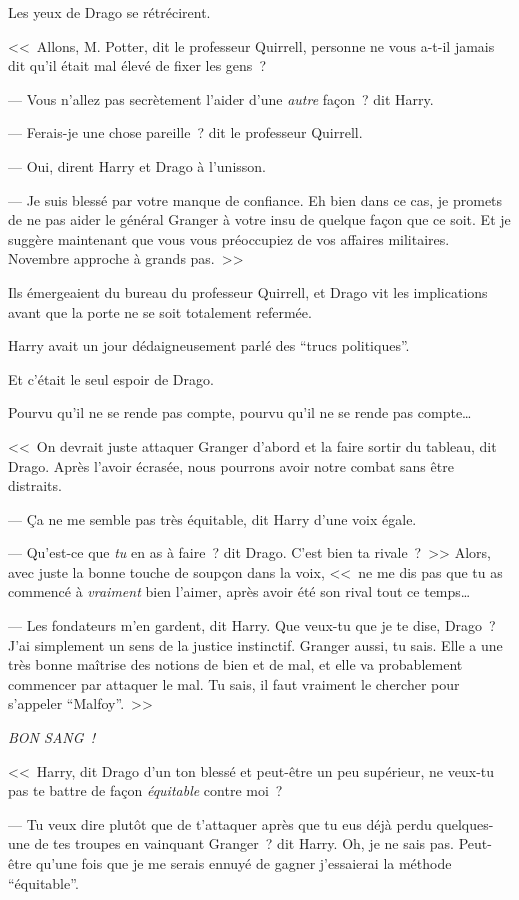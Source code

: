Les yeux de Drago se rétrécirent.

<<~Allons, M. Potter, dit le professeur Quirrell, personne ne vous a-t-il jamais dit qu'il était mal élevé de fixer les gens~?

--- Vous n'allez pas secrètement l'aider d'une \emph{autre} façon~? dit Harry.

--- Ferais-je une chose pareille~? dit le professeur Quirrell.

--- Oui, dirent Harry et Drago à l'unisson.

--- Je suis blessé par votre manque de confiance. Eh bien dans ce cas, je promets de ne pas aider le général Granger à votre insu de quelque façon que ce soit. Et je suggère maintenant que vous vous préoccupiez de vos affaires militaires. Novembre approche à grands pas.~>>

\later

Ils émergeaient du bureau du professeur Quirrell, et Drago vit les implications avant que la porte ne se soit totalement refermée.

Harry avait un jour dédaigneusement parlé des “trucs politiques”.

Et c'était le seul espoir de Drago.

Pourvu qu'il ne se rende pas compte, pourvu qu'il ne se rende pas compte…

<<~On devrait juste attaquer Granger d'abord et la faire sortir du tableau, dit Drago. Après l'avoir écrasée, nous pourrons avoir notre combat sans être distraits.

--- Ça ne me semble pas très équitable, dit Harry d'une voix égale.

--- Qu'est-ce que \emph{tu} en as à faire~? dit Drago. C'est bien ta rivale~?~>> Alors, avec juste la bonne touche de soupçon dans la voix, <<~ne me dis pas que tu as commencé à \emph{vraiment} bien l'aimer, après avoir été son rival tout ce temps…

--- Les fondateurs m'en gardent, dit Harry. Que veux-tu que je te dise, Drago~? J'ai simplement un sens de la justice instinctif. Granger aussi, tu sais. Elle a une très bonne maîtrise des notions de bien et de mal, et elle va probablement commencer par attaquer le mal. Tu sais, il faut vraiment le chercher pour s'appeler “Malfoy”.~>>

\emph{BON SANG~!}

<<~Harry, dit Drago d'un ton blessé et peut-être un peu supérieur, ne veux-tu pas te battre de façon \emph{équitable} contre moi~?

--- Tu veux dire plutôt que de t'attaquer après que tu eus déjà perdu quelques-une de tes troupes en vainquant Granger~? dit Harry. Oh, je ne sais pas. Peut-être qu'une fois que je me serais ennuyé de gagner j'essaierai la méthode “équitable”.

